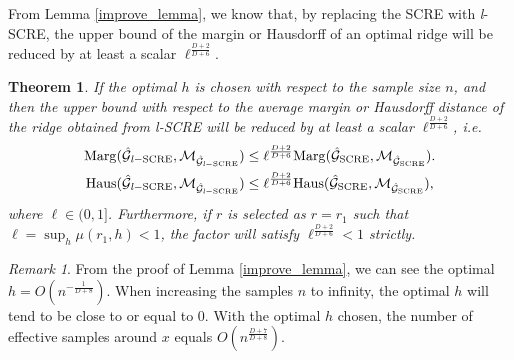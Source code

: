 \documentclass[aos,preprint]{imsart}
\newtheorem{theorem}{Theorem}[section]
\theoremstyle{remark}
\newtheorem*{remark}{Remark}
\begin{document}
From Lemma \ref{improve_lemma}, we know that, by replacing the SCRE with {\it l}-SCRE, the upper bound of the margin or Hausdorff of an optimal ridge will be reduced by at least a scalar $\ell^{\frac{D+2}{D+6}}$.
\begin{theorem}
 If the optimal $h$ is chosen with respect to the sample size $n$, 
and then the upper bound with respect to the average margin or Hausdorff distance of the ridge obtained from {\it l}-SCRE will be reduced by at least a scalar $\ell^{\frac{D+2}{D+6}}$,  i.e. 
\begin{gather*}
{\rm Marg}(\hat{\cal G}_{{\it l-}{\rm SCRE}}, {\cal M}_{\hat{\cal G}_{{\it l}-{\rm SCRE}}}) \leq \ell^{\frac{D+2}{D+6}} {\rm Marg}(\hat{\cal G}_{\rm SCRE}, {\cal M}_{\hat{\cal G}_{\rm SCRE}}).\\
{\rm Haus}(\hat{\cal G}_{{\it l-}{\rm SCRE}}, {\cal M}_{\hat{\cal G}_{{\it l}-{\rm SCRE}}}) \leq \ell^{\frac{D+2}{D+6}} {\rm Haus}(\hat{\cal G}_{\rm SCRE}, {\cal M}_{\hat{\cal G}_{\rm SCRE}}),
\end{gather*}
where $\ell\in(0,1]$. Furthermore, if $r$ is selected as $r = r_1$ such that $\ell=\sup_h \mu(r_1, h)<1$, the factor will satisfy $\ell^{\frac{D+2}{D+6}}<1$ strictly.
\end{theorem}
\begin{remark}
From the proof of Lemma \ref{improve_lemma}, we can see the optimal $h=O(n^{-\frac{1}{D+8}})$.  When increasing the samples $n$ to infinity, the optimal $h$ will tend to be close to or equal to 0. With the optimal $h$ chosen, the number of effective samples around $x$ equals $O(n^\frac{D+7}{D+8})$.
\end{remark}
\end{document}
